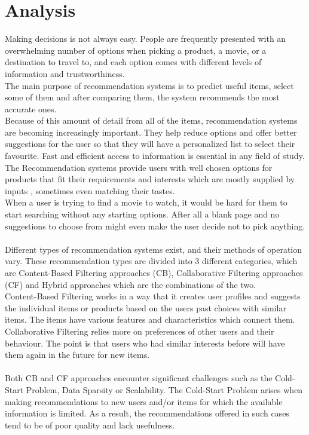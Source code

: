 \documentclass[10pt,oneside,english,a4paper]{article}
\begin{document}
\section{Analysis}
Making decisions is not always easy. People are frequently presented with an overwhelming number of options when picking a product, a movie, or a destination to travel to, and each option comes with different levels of information and trustworthiness. \\
The main purpose of recommendation systems is to predict useful items, select some of them and after comparing them, the system recommends the most accurate ones.\\ 
%
Because of this amount of detail from all of the items, recommendation systems are becoming increasingly important. They help reduce options and offer better suggestions for the user so that they will have a personalized list to select their favourite. Fast and efficient access to information is essential in any field of study. 
The Recommendation systems provide users with well chosen options for products that fit their requirements and interests which are mostly supplied by inputs \cite{Philip2014}, sometimes even matching their tastes.\\
%
When a user is trying to find a movie to watch, it would be hard for them to start searching without any starting options. After all a blank page and no suggestions to choose from might even make the user decide not to pick anything. \\\\
%
Different types of recommendation systems exist, and their methods of operation vary. These recommendation types are divided into 3 different categories, which are Content-Based Filtering approaches (CB), Collaborative Filtering approaches (CF) and Hybrid approaches which are the combinations of the two.\\
Content-Based Filtering works in a way that it creates user profiles and suggests the individual items or products based on the users past choices with similar items. The items have various features and characteristics which connect them.
Collaborative Filtering relies more on preferences of other users and their behaviour. The point is that users who had similar interests before will have them again in the future for new items.\\\\
Both CB and CF approaches encounter significant challenges such as the Cold-Start Problem, Data Sparsity or Scalability. The Cold-Start Problem arises when making recommendations to new users and/or items for which the available information is limited. As a result, the recommendations offered in such cases tend to be of poor quality and lack usefulness.\cite{Al-Hassan2024a}\\\\
%
%
%
%
%
\clearpage
\end{document}
